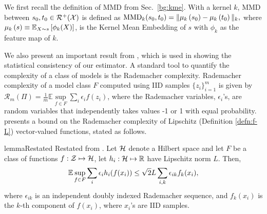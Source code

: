 We first recall the definition of MMD from Sec.~\ref{bg:kme}. With a kernel $k$, MMD between $s_0, t_0\in \mathcal{R}^+(\mathcal{X})$ is defined as $\textup{MMD}_k(s_0,t_0)= \|\mu_k\left(s_0\right)-\mu_k\left(t_0\right)\|_k,$
where $\mu_k\left(s\right)\equiv \mathbb{E}_{X\sim s}\left[\phi_k(X)\right]$, is the Kernel Mean Embedding of $s$ with $\phi_k$ as the feature map of $k$.  

We also present an important result from \cite{rad}, which is used in showing the statistical consistency of our estimator. A standard tool to quantify the complexity of a class of models is the Rademacher complexity. Rademacher complexity of a model class $F$ computed using IID samples $\{z_i\}_{i=1}^m$ is given by $\mathcal{R}_m(\Pi)=\frac{1}{m}\mathbb{E}\sup\limits_{f\in F} \sum\limits_{i} \epsilon_i f(z_i)$, where the Rademacher variables, $\epsilon_i$'s, are random variables that independently takes values -1 or 1 with equal probability. \citet[Corollary (4)]{rad} presents a bound on the Rademacher complexity of Lipschitz (Definition \ref{defn:f-L}) vector-valued functions, stated as follows.

\begin{restatable}{lemma}{Restated}\label{vecrad}
Restated from \citet[Corollary (4)]{rad}. 
Let $\mathcal{H}$ denote a Hilbert space and let $F$ be a class of functions $f:\mathcal{Z}\mapsto \mathcal{H}$, let $h_i:\mathcal{H}\mapsto \mathbb{R}$ have Lipschitz norm $L$. Then,
$$\mathbb{E}\sup_{f\in F} \sum_i \epsilon_i h_i(f(x_i))\leq \sqrt{2}L\sum_{i,k} \epsilon_{ik} f_k(x_i),$$
where $\epsilon_{ik}$ is an independent doubly indexed Rademacher sequence, and $f_k(x_i)$ is
the $k$-th component of $f(x_i)$, where $x_i$'s are IID samples.
\end{restatable}

